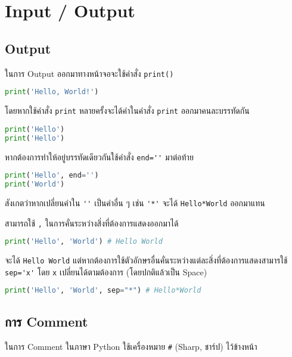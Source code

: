 \section{Input / Output}

\subsection{Output}

ในการ Output ออกมาทางหน้าจอจะใช้คำสั่ง \verb|print()|

\begin{lstlisting}[language=Python]
print('Hello, World!')
\end{lstlisting}

โดยหากใช้คำสั่ง \verb|print| หลายครั้งจะได้คำในคำสั่ง \verb|print| ออกมาคนละบรรทัดกัน

\begin{lstlisting}[language=Python]
print('Hello')
print('Hello')
\end{lstlisting}

หากต้องการทำให้อยู่บรรทัดเดียวกันใช้คำสั่ง \verb|end=''| มาต่อท้าย

\begin{lstlisting}[language=Python]
print('Hello', end='')
print('World')
\end{lstlisting}

สังเกตว่าหากเปลี่ยนคำใน \verb|''| เป็นคำอื่น ๆ เช่น \verb|'*'| จะได้ \verb|Hello*World| ออกมาแทน

สามารถใช้ \verb|,| ในการคั่นระหว่างสิ่งที่ต้องการแสดงออกมาได้

\begin{lstlisting}[language=Python]
print('Hello', 'World') # Hello World
\end{lstlisting}

จะได้ \verb|Hello World| แต่หากต้องการใช้ตัวอักษรอื่นคั่นระหว่างแต่ละสิ่งที่ต้องการแสดงสามารใช้ \verb|sep='x'| โดย \verb|x| เปลี่ยนได้ตามต้องการ (โดยปกติแล้วเป็น Space)

\begin{lstlisting}[language=Python]
print('Hello', 'World', sep="*") # Hello*World
\end{lstlisting}

\subsection{การ Comment}

ในการ Comment ในภาษา Python ใช้เครื่องหมาย \verb|#| (Sharp, ชาร์ป) ไว้ข้างหน้า

